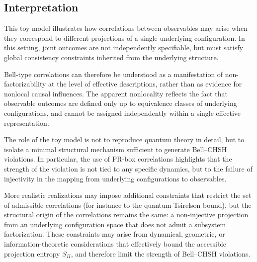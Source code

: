 \subsection{Interpretation}
  \label{subsec:interpretation}

  This toy model illustrates how correlations between observables may arise when they
  correspond to different projections of a single underlying configuration.
  In this setting, joint outcomes are not independently specifiable, but must satisfy
  global consistency constraints inherited from the underlying structure.

  Bell-type correlations can therefore be understood as a manifestation of
  non-factorizability at the level of effective descriptions, rather than as evidence
  for nonlocal causal influences.
  The apparent nonlocality reflects the fact that observable outcomes are defined only
  up to equivalence classes of underlying configurations, and cannot be assigned
  independently within a single effective representation.

  The role of the toy model is not to reproduce quantum theory in detail, but to
  isolate a minimal structural mechanism sufficient to generate Bell--CHSH violations.
  In particular, the use of PR-box correlations highlights that the strength of the
  violation is not tied to any specific dynamics, but to the failure of injectivity
  in the mapping from underlying configurations to observables.

  More realistic realizations may impose additional constraints that restrict the set
  of admissible correlations (for instance to the quantum Tsirelson bound), but the
  structural origin of the correlations remains the same: a non-injective projection
  from an underlying configuration space that does not admit a subsystem factorization.
  These constraints may arise from dynamical, geometric, or information-theoretic
  considerations that effectively bound the accessible projection entropy $S_{\Pi}$,
  and therefore limit the strength of Bell--CHSH violations.
